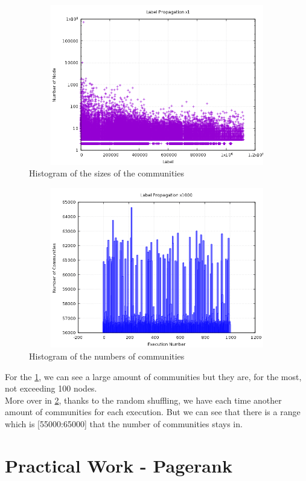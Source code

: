 \documentclass{article}
\begin{document}
\begin{figure}[h!]
\includegraphics[width=12cm, height=7cm]{labelPropagationx1.png}
  \caption{\label{fig:histoSize}Histogram of the sizes of the communities}
\end{figure}
\FloatBarrier

\begin{figure}[h!]
\includegraphics[width=12cm, height=7cm]{labelPropagationx1000.png}
  \caption{\label{fig:histoNum}Histogram of the numbers of communities}
\end{figure}
\FloatBarrier

For the \cref{fig:histoSize}, we can see a large amount of communities but they are, for the most, not exceeding 100 nodes.\\
More over in \cref{fig:histoNum}, thanks to the random shuffling, we have each time another amount of communities for each execution. But we can see that there is a range which is [55000:65000] that the number of communities stays in.


\section{Practical Work - Pagerank}
\end{document}
